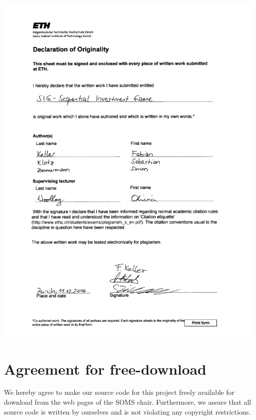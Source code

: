 \documentclass[11pt]{article}
\begin{document}


\begin{center}
	\includegraphics[scale=0.95]{Declaration_of_originality_signed_final}
\end{center}

\newpage

\section*{Agreement for free-download}
\bigskip
\bigskip
\large We hereby agree to make our source code for this project freely available for download from the web pages of the SOMS chair. Furthermore, we assure that all source code is written by ourselves and is not violating any copyright restrictions.
\end{document}
